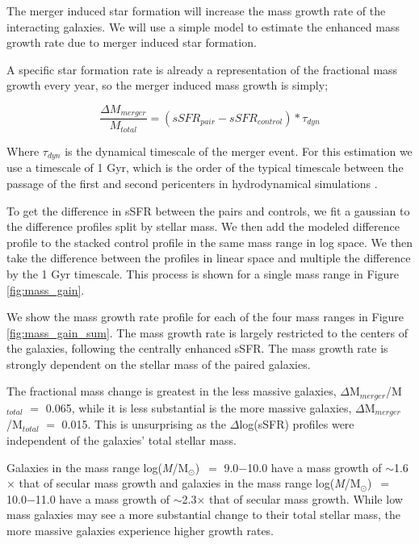 \documentclass[iop,revtex4,twocolumn,apj,numberedappendix,appendixfloats]{emulateapj}
\newcommand{\logm}{log({\it M}/M$_{\odot}$)}
\begin{document}
The merger induced star formation will increase the mass growth rate of the interacting galaxies. We will use a simple model to estimate the enhanced mass growth rate due to merger induced star formation. 

A specific star formation rate is already a representation of the fractional mass growth every year, so the merger induced mass growth is simply;

\begin{equation}
\frac{\Delta M_{merger}}{M_{total}} = \left(sSFR_{pair} - sSFR_{control}\right) * \tau_{dyn}
\end{equation}

Where $\tau_{dyn}$ is the dynamical timescale of the merger event. For this estimation we use a timescale of 1 Gyr, which is the order of the typical timescale between the passage of the first and second pericenters in hydrodynamical simulations \citep{Boylan-Kolchin:2008}. 

To get the difference in sSFR between the pairs and controls, we fit a gaussian to the difference profiles split by stellar mass. We then add the modeled difference profile to the stacked control profile in the same mass range in log space. We then take the difference between the profiles in linear space and multiple the difference by the 1 Gyr timescale. This process is shown for a single mass range in Figure \ref{fig:mass_gain}.

We show the mass growth rate profile for each of the four mass ranges in Figure \ref{fig:mass_gain_sum}. The mass growth rate is largely restricted to the centers of the galaxies, following the centrally enhanced sSFR. The mass growth rate is strongly dependent on the stellar mass of the paired galaxies. 

The fractional mass change is greatest in the less massive galaxies, $\Delta$M$_{merger}$/M$_{total}$ $=$ 0.065, while it is less substantial is the more massive galaxies, $\Delta$M$_{merger}$/M$_{total}$ $=$ 0.015. This is unsurprising as the $\Delta$log(sSFR) profiles were independent of the galaxies' total stellar mass. 

Galaxies in the mass range \logm\ $=$ 9.0$-$10.0 have a mass growth of $\sim$1.6$\times$ that of secular mass growth and galaxies in the mass range \logm\ $=$ 10.0$-$11.0 have a mass growth of $\sim$2.3$\times$ that of secular mass growth. While low mass galaxies may see a more substantial change to their total stellar mass, the more massive galaxies experience higher growth rates.
\end{document}
